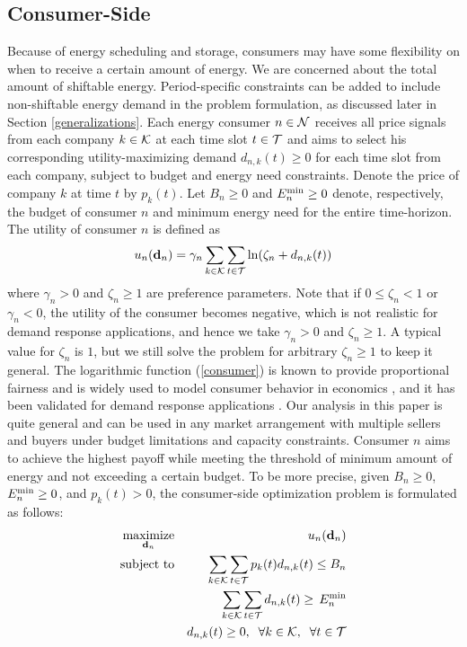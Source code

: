 \subsection{Consumer-Side} 
Because of energy scheduling and storage, consumers may have some flexibility on when to receive a certain amount of energy. We are concerned about the total amount of shiftable energy. {\color{blue}Period-specific constraints can be added to include non-shiftable energy demand in the problem formulation, as discussed later in Section \ref{generalizations}}. Each energy consumer $n\in {\cal N}$ receives all price signals from each company $k\in {\cal K}$ at each time slot $t\in {\cal T}$ and aims to select his corresponding utility-maximizing demand $d_{n,k}(t)\geq0$ for each time slot from each company, subject to budget and energy need constraints. Denote the price of company $k$ at time $t$ by $p_k(t)$. Let $B_n \geq 0$  and $E^{{\rm min}}_n \geq 0$ denote, respectively, the budget of consumer $n$ and minimum energy need for the entire time-horizon. The utility of consumer $n$ is defined as 
\begin{equation}{ u_n(\mathbf{d}_{n})=\gamma_n\sum_{k\in {\cal K}}\sum_{t\in {\cal T}}\ln(\zeta_n+d_{n,k}(t))} \label{consumer}\end{equation} 
where $\gamma_n>0$ and $\zeta_n\geq1$ are preference parameters.  Note that if $0\leq\zeta_n<1$ or $\gamma_n<0$, the utility of the consumer becomes negative, which is not realistic for demand response applications, and hence we take $\gamma_n>0$ and $\zeta_n\geq1$. A typical value for $\zeta_n$ is $1$, but we still solve the problem for arbitrary $\zeta_n\geq1$ to keep it general. {\color{black}The logarithmic function (\ref{consumer}) is known to provide proportional fairness and is widely used to model consumer behavior in economics \cite{srikant,shadow,gao,basarDR,basarDR2}, {and it has been validated for demand response applications \cite{gao,fan2,han,DRadaptation,sabita}}. Our analysis in this paper is quite general and can be used in any market arrangement with multiple sellers and buyers under budget limitations and capacity constraints.}
Consumer $n$ aims to achieve the highest payoff while meeting the threshold of minimum amount of energy and not exceeding a certain budget. To be more precise,
given $B_n \geq 0$, $E^{{\rm min}}_n \geq 0$, and $p_k(t)>0$, the consumer-side optimization problem is formulated as follows:
\begin{eqnarray}
\underset{\mathbf{d}_{n}}{\hbox{maximize}} && u_n(\mathbf{d}_{n}) \nonumber \\
\hbox{subject to} && \sum_{k\in {\cal K}}\sum_{t\in {\cal T}}p_k(t)d_{n,k}(t)\leq B_n \label{cc1}\\
&& \sum_{k\in {\cal K}}\sum_{t\in {\cal T}}d_{n,k}(t)\geq \,E^{{\rm min}}_n \label{cc}\\
&&d_{n,k}(t)\geq 0,\;\;   \forall k \in {\cal K},\;\;  \forall t \in {\cal T} \label{cc3}
\end{eqnarray}
